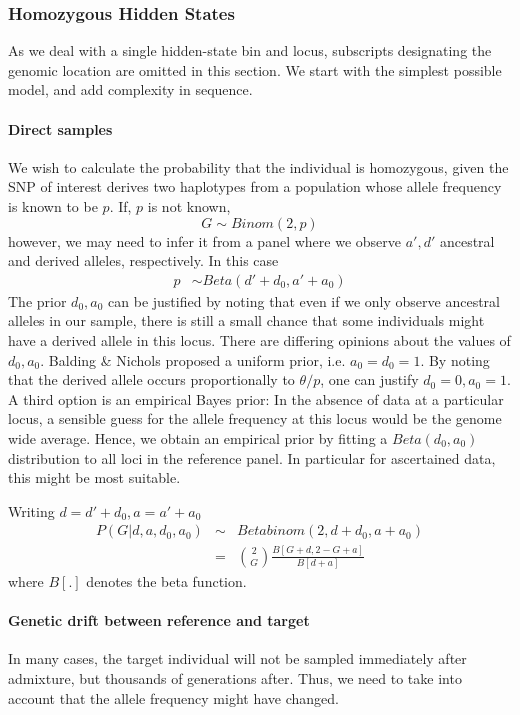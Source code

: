 \documentclass[10pt,a4paper]{article}
\begin{document}
\subsubsection{Homozygous Hidden States}
As we deal with a single hidden-state bin and locus, subscripts designating the genomic location are omitted in this section. We start with the simplest possible model, and add complexity in sequence.
\paragraph{Direct samples}
We wish to calculate the probability that the individual is homozygous, given the SNP of interest derives two haplotypes from a population whose allele frequency is known to be $p$. If, $p$ is not known, 
\begin{equation}
G \sim Binom(2, p)
\end{equation}
however, we may need to infer it from a panel where we observe $a', d'$ ancestral and derived alleles, respectively. In this case
\begin{align}
p &\sim Beta(d' + d_0, a' + a_0)
\end{align}
The prior $d_0, a_0$ can be justified by noting that even if we only observe ancestral alleles in our sample, there is still a small chance that some individuals might have a derived allele in this locus. There are differing opinions about the values of $d_0, a_0$. Balding \& Nichols proposed a uniform prior, i.e. $a_0=d_0=1$. By noting that the derived allele occurs proportionally to $\theta/p$, one can justify $d_0=0, a_0=1$. A third option is an empirical Bayes prior: In the absence of data at a particular locus, a sensible guess for the allele frequency at this locus would be the genome wide average. Hence, we obtain an empirical prior by fitting a $Beta(d_0, a_0)$ distribution to all loci in the reference panel. In particular for ascertained data, this might be most suitable.

Writing $d = d' + d_0, a = a'+a_0$
\begin{eqnarray}
P(G | d, a, d_0, a_0) &\sim& Betabinom(2, d+d_0, a+a_0)\nonumber\\
&=& \binom{2}{G} \frac{B[G+d, 2-G + a]}{B[ d + a]} \label{eq:ll:homo}
\end{eqnarray}
where $B[.]$ denotes the beta function.
\paragraph{Genetic drift between reference and target}
In many cases, the target individual will not be sampled immediately after admixture, but thousands of generations after. Thus, we need to take into account that the allele frequency might have changed.
\end{document}
